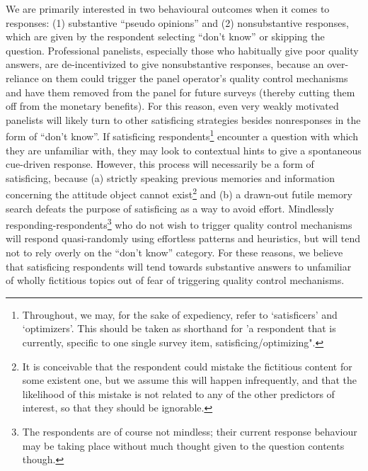 \documentclass[Royal,times,sageh]{sagej}
\begin{document}
We are primarily interested in two behavioural outcomes when it comes to
responses: (1) substantive ``pseudo opinions'' and (2) nonsubstantive
responses, which are given by the respondent selecting ``don't know'' or
skipping the question. Professional panelists, especially those who
habitually give poor quality answers, are de-incentivized to give
nonsubstantive responses, because an over-reliance on them could trigger
the panel operator's quality control mechanisms and have them removed
from the panel for future surveys (thereby cutting them off from the
monetary benefits). For this reason, even very weakly motivated
panelists will likely turn to other satisficing strategies besides
nonresponses in the form of ``don't know''. If satisficing
respondents\footnote{Throughout, we may, for the sake of expediency,
  refer to `satisficers' and `optimizers'. This should be taken as
  shorthand for 'a respondent that is currently, specific to one single
  survey item, satisficing/optimizing".} encounter a question with which
they are unfamiliar with, they may look to contextual hints to give a
spontaneous cue-driven response. However, this process will necessarily
be a form of satisficing, because (a) strictly speaking previous
memories and information concerning the attitude object cannot
exist\footnote{It is conceivable that the respondent could mistake the
  fictitious content for some existent one, but we assume this will
  happen infrequently, and that the likelihood of this mistake is not
  related to any of the other predictors of interest, so that they
  should be ignorable.} and (b) a drawn-out futile memory search defeats
the purpose of satisficing as a way to avoid effort. Mindlessly
responding-respondents\footnote{The respondents are of course not
  mindless; their current response behaviour may be taking place without
  much thought given to the question contents though.} who do not wish
to trigger quality control mechanisms will respond quasi-randomly using
effortless patterns and heuristics, but will tend not to rely overly on
the ``don't know'' category. For these reasons, we believe that
satisficing respondents will tend towards substantive answers to
unfamiliar of wholly fictitious topics out of fear of triggering quality
control mechanisms.
\end{document}
